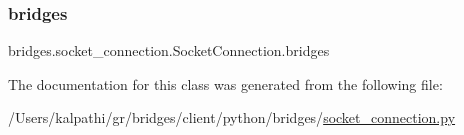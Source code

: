 \subsubsection{\texorpdfstring{bridges}{bridges}}
{\footnotesize\ttfamily bridges.\+socket\+\_\+connection.\+Socket\+Connection.\+bridges}



The documentation for this class was generated from the following file\+:\begin{DoxyCompactItemize}
\item 
/\+Users/kalpathi/gr/bridges/client/python/bridges/\mbox{\hyperlink{socket__connection_8py}{socket\+\_\+connection.\+py}}\end{DoxyCompactItemize}
